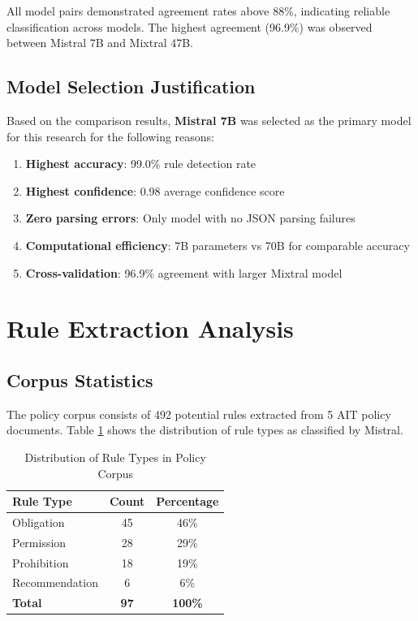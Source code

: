 All model pairs demonstrated agreement rates above 88\%, indicating reliable classification across models. The highest agreement (96.9\%) was observed between Mistral 7B and Mixtral 47B.

\subsection{Model Selection Justification}

Based on the comparison results, \textbf{Mistral 7B} was selected as the primary model for this research for the following reasons:

\begin{enumerate}
    \item \textbf{Highest accuracy}: 99.0\% rule detection rate
    \item \textbf{Highest confidence}: 0.98 average confidence score
    \item \textbf{Zero parsing errors}: Only model with no JSON parsing failures
    \item \textbf{Computational efficiency}: 7B parameters vs 70B for comparable accuracy
    \item \textbf{Cross-validation}: 96.9\% agreement with larger Mixtral model
\end{enumerate}

\section{Rule Extraction Analysis}

\subsection{Corpus Statistics}

The policy corpus consists of 492 potential rules extracted from 5 AIT policy documents. Table \ref{tab:rule-distribution} shows the distribution of rule types as classified by Mistral.

\begin{table}[h]
\centering
\caption{Distribution of Rule Types in Policy Corpus}
\label{tab:rule-distribution}
\begin{tabular}{|l|c|c|}
\hline
\textbf{Rule Type} & \textbf{Count} & \textbf{Percentage} \\
\hline
Obligation & 45 & 46\% \\
Permission & 28 & 29\% \\
Prohibition & 18 & 19\% \\
Recommendation & 6 & 6\% \\
\hline
\textbf{Total} & \textbf{97} & \textbf{100\%} \\
\hline
\end{tabular}
\end{table}

